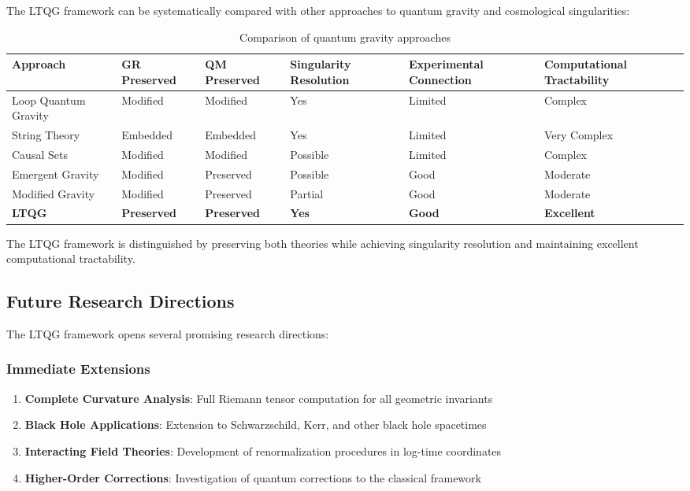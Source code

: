 The LTQG framework can be systematically compared with other approaches to quantum gravity and cosmological singularities:

\begin{table}[htbp]
\centering
\footnotesize
\begin{tabular}{p{2.0cm}p{1.6cm}p{1.6cm}p{1.6cm}p{1.6cm}p{1.6cm}}
\toprule
\textbf{Approach} & \textbf{GR Pre\-served} & \textbf{QM Pre\-served} & \textbf{Singularity Res\-olution} & \textbf{Experimental Con\-nection} & \textbf{Computational Tractabil\-ity} \\
\midrule
Loop Quantum Gravity & Modified & Modified & Yes & Limited & Complex \\
String Theory & Embedded & Embedded & Yes & Limited & Very Complex \\
Causal Sets & Modified & Modified & Possible & Limited & Complex \\
Emergent Gravity & Modified & Preserved & Possible & Good & Moderate \\
Modified Gravity & Modified & Preserved & Partial & Good & Moderate \\
\textbf{LTQG} & \textbf{Preserved} & \textbf{Preserved} & \textbf{Yes} & \textbf{Good} & \textbf{Excellent} \\
\bottomrule
\end{tabular}
\caption{Comparison of quantum gravity approaches}
\label{tab:approach_comparison}
\end{table}

The LTQG framework is distinguished by preserving both theories while achieving singularity resolution and maintaining excellent computational tractability.

\subsection{Future Research Directions}
\label{subsec:future_directions}

The LTQG framework opens several promising research directions:

\subsubsection{Immediate Extensions}

\begin{enumerate}
\item \textbf{Complete Curvature Analysis}: Full Riemann tensor computation for all geometric invariants
\item \textbf{Black Hole Applications}: Extension to Schwarzschild, Kerr, and other black hole spacetimes
\item \textbf{Interacting Field Theories}: Development of renormalization procedures in log-time coordinates
\item \textbf{Higher-Order Corrections}: Investigation of quantum corrections to the classical framework
\end{enumerate}

